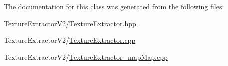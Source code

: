 The documentation for this class was generated from the following files\+:\begin{DoxyCompactItemize}
\item 
Texture\+Extractor\+V2/\hyperlink{_texture_extractor_8hpp}{Texture\+Extractor.\+hpp}\item 
Texture\+Extractor\+V2/\hyperlink{_texture_extractor_8cpp}{Texture\+Extractor.\+cpp}\item 
Texture\+Extractor\+V2/\hyperlink{_texture_extractor__map_map_8cpp}{Texture\+Extractor\+\_\+map\+Map.\+cpp}\end{DoxyCompactItemize}
